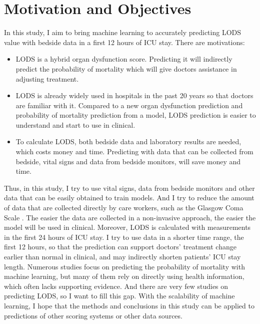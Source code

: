 \documentclass[12pt,a4paper,english
]{tunithesis}
\begin{document}
\section{Motivation and Objectives}
In this study, I aim to bring machine learning to accurately predicting LODS value with bedside data in a first 12 hours of ICU stay. There are motivations:
\begin{itemize}
\item LODS is a hybrid organ dysfunction score. Predicting it will indirectly predict the probability of mortality which will give doctors assistance in adjusting treatment.
\item LODS is already widely used in hospitals in the past 20 years so that doctors are familiar with it. Compared to a new organ dysfunction prediction and probability of mortality prediction from a model, LODS prediction is easier to understand and start to use in clinical.
\item To calculate LODS, both bedside data and laboratory results are needed, which costs money and time. Predicting with data that can be collected from bedside, vital signs and data from bedside monitors, will save money and time.
\end{itemize}
Thus, in this study, I try to use vital signs, data from bedside monitors and other data that can be easily obtained to train models. And I try to reduce the amount of data that are collected directly by care workers, such as the Glasgow Coma Scale \parencite{Jain2023}. The easier the data are collected in a non-invasive approach, the easier the model will be used in clinical. Moreover, LODS is calculated with measurements in the first 24 hours of ICU stay. I try to use data in a shorter time range, the first 12 hours, so that the prediction can support doctors' treatment change earlier than normal in clinical, and may indirectly shorten patients' ICU stay length. 
Numerous studies focus on predicting the probability of mortality with machine learning, but many of them rely on directly using health information, which often lacks supporting evidence. And there are very few studies on predicting LODS, so I want to fill this gap. With the scalability of machine learning, I hope that the methods and conclusions in this study can be applied to predictions of other scoring systems or other data sources.
\end{document}
